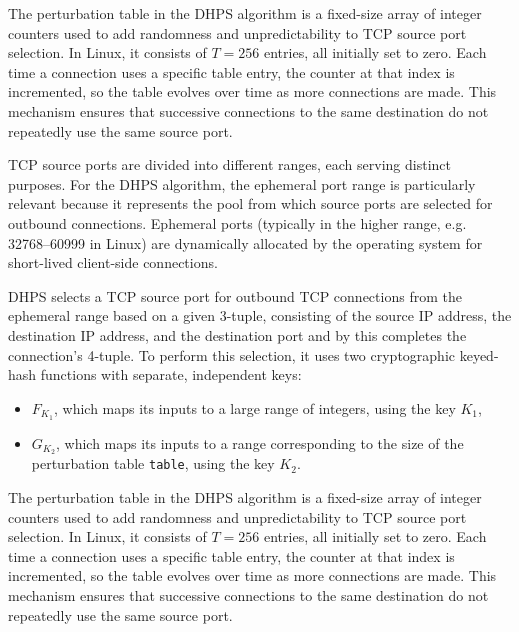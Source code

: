 \documentclass[twocolumn]{report}
\begin{document}
{	The \alert{perturbation table} in the DHPS algorithm is a fixed-size array of integer counters used to add randomness and unpredictability to TCP source port selection. In Linux, it consists of $T = 256$ entries, all initially set to zero. Each time a connection uses a specific table entry, the counter at that index is incremented, so the table evolves over time as more connections are made. This mechanism ensures that successive connections to the same destination do not repeatedly use the same source port.%
}{
	TCP source ports are divided into different ranges, each serving distinct purposes. For the DHPS algorithm, the ephemeral port range is particularly relevant because it represents the pool from which source ports are selected for outbound connections. \alert{Ephemeral ports} (typically in the higher range, e.g. 32768–60999 in Linux) are dynamically allocated by the operating system for short-lived client-side connections.

	DHPS selects a TCP \alert{source port} for outbound TCP connections from the ephemeral range based on a given \alert{3-tuple}, consisting of the \alert{source IP} address, the \alert{destination IP} address, and the \alert{destination port} and by this completes the connection’s \alert{4-tuple}. To perform this selection, it uses two \alert{cryptographic keyed-hash functions} with separate, independent keys:
	\begin{itemize}
		\item \( F_{K_1} \), which maps its inputs to a large range of integers, using the key \( K_1 \),
		\item \( G_{K_2} \), which maps its inputs to a range corresponding to the size of the \alert{perturbation table} \texttt{table}, using the key \( K_2 \).
	\end{itemize}
	The \alert{perturbation table} in the DHPS algorithm is a fixed-size array of integer counters used to add randomness and unpredictability to TCP source port selection. In Linux, it consists of $T = 256$ entries, all initially set to zero. Each time a connection uses a specific table entry, the counter at that index is incremented, so the table evolves over time as more connections are made. This mechanism ensures that successive connections to the same destination do not repeatedly use the same source port. %
}
\end{document}
